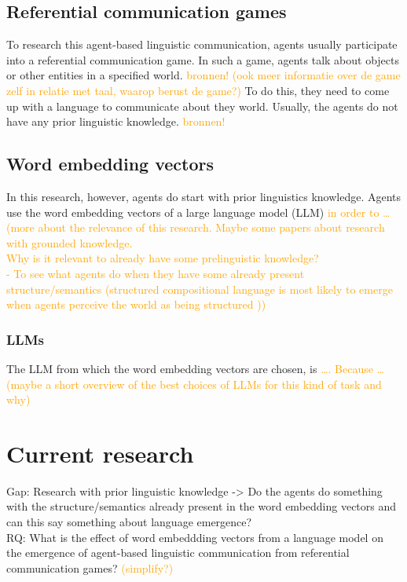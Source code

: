 \documentclass[a4paper, 12pt]{report}
\begin{document}
\subsection{Referential communication games}
To research this agent-based linguistic communication, agents usually participate into a referential communication game. 
In such a game, agents talk about objects or other entities in a specified world.
\textcolor{orange}{bronnen! (ook meer informatie over de game zelf in relatie met taal, waarop berust de game?)}
To do this, they need to come up with a language to communicate about they world. 
Usually, the agents do not have any prior linguistic knowledge.
\textcolor{orange}{bronnen!} 

\subsection{Word embedding vectors}
In this research, however, agents do start with prior linguistics knowledge. 
Agents use the word embedding vectors of a large language model (LLM) \textcolor{orange}{in order to \dots (more about the relevance of this research. Maybe some papers about research with grounded knowledge. \\ Why is it relevant to already have some prelinguistic knowledge? \\ - To see what agents do when they have some already present structure/semantics (structured compositional language is most likely to emerge when agents perceive the world as being structured \cite{LazaridouAngeliki2018EoLC}))}

\subsubsection{LLMs}
The LLM from which the word embedding vectors are chosen, is \textcolor{orange}{\dots. Because \dots (maybe a short overview of the best choices of LLMs for this kind of task and why)}

\section{Current research}
Gap: Research with prior linguistic knowledge -> Do the agents do something with the structure/semantics already present in the word embedding vectors and can this say something about language emergence? \\
RQ: What is the effect of word embeddding vectors from a language model on the emergence of agent-based linguistic communication from referential communication games? \textcolor{orange}{(simplify?)}
\end{document}
